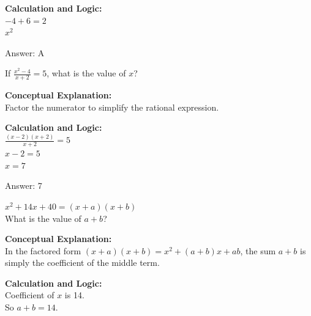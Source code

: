 \documentclass[11pt,paper=a4,answers]{exam}
\begin{document}
\begin{questions}
\begin{solution}
\vspace{20pt}

\textbf{Calculation and Logic:} \\
$-4 + 6 = 2$ \\
$x^2$

\vspace{25pt}

Answer: \colorbox{yellow!100}{A}
\end{solution}

\vspace{40pt}

\question
If $\frac{x^2 - 4}{x + 2} = 5$, what is the value of $x$?

\begin{solution}
\textbf{Conceptual Explanation:} \\
Factor the numerator to simplify the rational expression.

\vspace{20pt}

\textbf{Calculation and Logic:} \\
$\frac{(x - 2)(x + 2)}{x + 2} = 5$ \\
$x - 2 = 5$ \\
$x = 7$

\vspace{25pt}

Answer: \colorbox{yellow!100}{7}
\end{solution}

\vspace{40pt}

\question
$x^2 + 14x + 40 = (x + a)(x + b)$ \\
What is the value of $a + b$?

\begin{solution}
\textbf{Conceptual Explanation:} \\
In the factored form $(x + a)(x + b) = x^2 + (a + b)x + ab$, the sum $a+b$ is simply the coefficient of the middle term.

\vspace{20pt}

\textbf{Calculation and Logic:} \\
Coefficient of $x$ is 14. \\
So $a + b = 14$.

\vspace{25pt}


\end{solution}
\end{questions}
\end{document}
